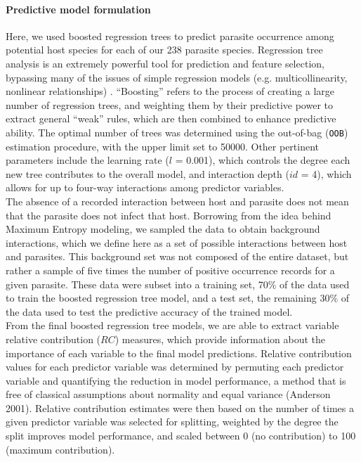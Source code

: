 \documentclass[12pt]{article}
\begin{document}
 
 \paragraph{Predictive model formulation}
  Here, we used boosted regression trees to predict parasite occurrence among potential host species for each of our 238 parasite species. Regression tree analysis is an extremely powerful tool for prediction and feature selection, bypassing many of the issues of simple regression models (e.g. multicollinearity, nonlinear relationships) \cite{elith2008, dallas2014}. “Boosting” refers to the process of creating a large number of regression trees, and weighting them by their predictive power to extract general “weak” rules, which are then combined to enhance predictive ability. The optimal number of trees was determined using the out-of-bag (\texttt{OOB}) estimation procedure, with the upper limit set to 50000. Other pertinent parameters include the learning rate ($l$ = 0.001), which controls the degree each new tree contributes to the overall model, and interaction depth ($id$ = 4), which allows for up to four-way interactions among predictor variables. \\
  
  The absence of a recorded interaction between host and parasite does not mean that the parasite does not infect that host. Borrowing from the idea behind Maximum Entropy modeling, we sampled the data to obtain background interactions, which we define here as a set of possible interactions between host and parasites. This background set was not composed of the entire dataset, but rather a sample of five times the number of positive occurrence records for a given parasite. These data were subset into a training set, 70\% of the data used to train the boosted regression tree model, and a test set, the remaining 30\% of the data used to test the predictive accuracy of the trained model. \\
  
  From the final boosted regression tree models, we are able to extract variable relative contribution ($RC$) measures, which provide information about the importance of each variable to the final model predictions. Relative contribution values for each predictor variable was determined by permuting each predictor variable and quantifying the reduction in model performance, a method that is free of classical assumptions about normality and equal variance (Anderson 2001). Relative contribution estimates were then based on the number of times a given predictor variable was selected for splitting, weighted by the degree the split improves model performance, and scaled between 0 (no contribution) to 100 (maximum contribution). \\
  
\end{document}
